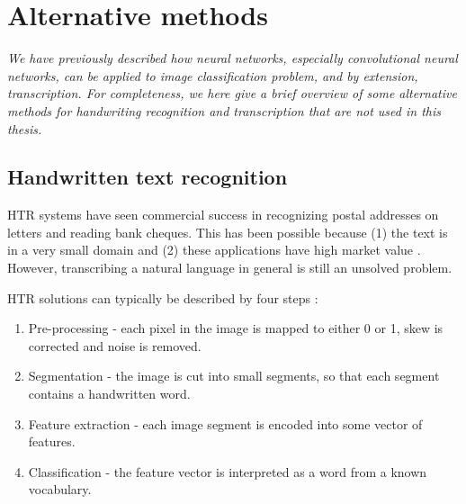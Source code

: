 
\chapter{Alternative methods}
\textit{ We have previously described how neural networks, especially convolutional neural networks, can be applied to image classification problem, and by extension, transcription.
For completeness, we here give a brief overview of some alternative methods for handwriting recognition and transcription that are not used in this thesis.}



\section{Handwritten text recognition}

HTR systems have
seen commercial success in
recognizing postal addresses on letters \cite{lecun_1989, zipcode_system} and reading bank cheques. This has been possible because (1) the text is in a very small domain and (2) these applications have high market value \cite{40_years_HWR}. However, transcribing a natural language in general is still an unsolved problem.

HTR solutions can typically be described by four steps \cite{offline_HWR_CNN}:
\begin{enumerate}
    \item Pre-processing - each pixel in the image is mapped to either 0 or 1, skew is corrected and noise is removed.
    \item Segmentation - the image is cut into small segments, so that each segment contains a handwritten word.
    \item Feature extraction - each image segment is encoded into some vector of features.
    \item Classification - the feature vector is interpreted as a word from a known vocabulary.
\end{enumerate}

